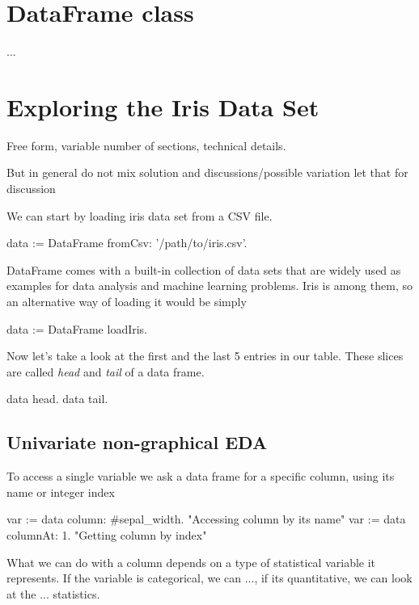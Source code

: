 \documentclass{article}
\begin{document}
\section{DataFrame class}
\label{sec:dataframe}
...

\section{Exploring the Iris Data Set}
\label{sec:contribution}

Free form, variable number of sections, technical details.

But in general do not mix solution and discussions/possible variation
let that for discussion

We can start by loading iris data set from a CSV file.
\begin{code}{}
data := DataFrame fromCsv: '/path/to/iris.csv'.
\end{code}

DataFrame comes with a built-in collection of data sets that are widely used as examples for data analysis and machine learning problems. Iris is among them, so an alternative way of loading it would be simply

\begin{code}{}
data := DataFrame loadIris.
\end{code}

Now let's take a look at the first and the last 5 entries in our table. These slices are called \textit{head} and \textit{tail} of a data frame.

\begin{code}{}
data head.
data tail.
\end{code}

\subsection{Univariate non-graphical EDA}
To access a single variable we ask a data frame for a specific column, using its name or integer index

\begin{code}{}
var := data column: #sepal_width. "Accessing column by its name"
var := data columnAt: 1. "Getting column by index"
\end{code}

What we can do with a column depends on a type of statistical variable it represents. If the variable is categorical, we can ..., if its quantitative, we can look at the ... statistics.
\end{document}

